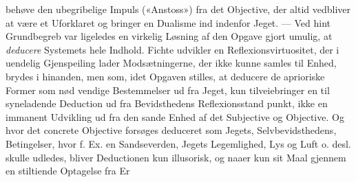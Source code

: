 \documentclass[12pt,a4paper]{book}
\begin{document}
behøve den ubegribelige Impuls («Anstoss») fra det Objective,
der altid vedbliver at være et Uforklaret og bringer en Dualisme
ind indenfor Jeget. --- Ved hint Grundbegreb var ligeledes en
virkelig Løsning af den Opgave gjort umulig, at \emph{deducere}
Systemets hele Indhold. Fichte udvikler en Reflexionsvirtuositet,
der i uendelig Gjenspeiling lader Modsætningerne, der ikke
kunne samles til Enhed, brydes i hinanden, men som, idet
Opgaven stilles, at deducere de aprioriske Former som nød\-%
vendige Bestemmelser ud fra Jeget, kun tilveiebringer en til\-%
syneladende Deduction ud fra Bevidsthedens Reflexionsstand\-%
punkt, ikke en immanent Udvikling ud fra den sande Enhed
af det Subjective og Objective. Og hvor det concrete Objective
forsøges deduceret som Jegets, Selvbevidsthedens, Betingelser,
hvor f. Ex. en Sandseverden, Jegets Legemlighed, Lys og Luft
o. desl. skulle udledes, bliver Deductionen kun illusorisk, og
naaer kun sit Maal gjennem en stiltiende Optagelse fra Er\-%
\end{document}
